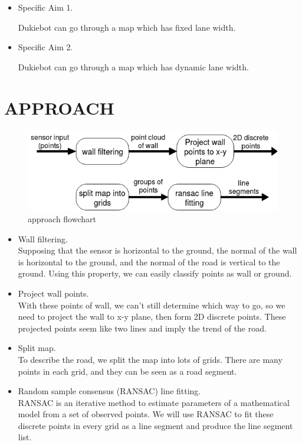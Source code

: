 \documentclass[letterpaper, 10 pt, conference]{ieeeconf}  %
\begin{document}
\begin{itemize}

\item Specific Aim 1.

Dukiebot can go through a map which has fixed lane width.
\item Specific Aim 2.

Dukiebot can go through a map which has dynamic lane width.
\end{itemize}

\section{APPROACH}


\begin{figure}[ht] %
\includegraphics[width=1.0\columnwidth]{approach1.png}
\centering
\caption{approach flowchart}
\end{figure}

\begin{itemize}

\item Wall filtering.\\ 
Supposing that the sensor is horizontal to the ground, the normal of the wall is horizontal to the ground, and the normal of the road is vertical to the ground. Using this property, we can easily classify points as wall or ground.

\item Project wall points.\\ 
With these points of wall, we can't still determine which way to go, so we need to project the wall to x-y plane, then form 2D discrete points. These projected points seem like two lines and imply the trend of the road. 

\item Split map.\\ 
To describe the road, we split the map into lots of grids. There are many points in each grid, and they can be seen as a road segment.

\item Random sample consensus (RANSAC) line fitting.\\ 
RANSAC is an iterative method to estimate parameters of a mathematical model from a set of observed points. We will use RANSAC to fit these discrete points in every grid as a line segment and produce the line segment list.

\end{itemize}
\end{document}
